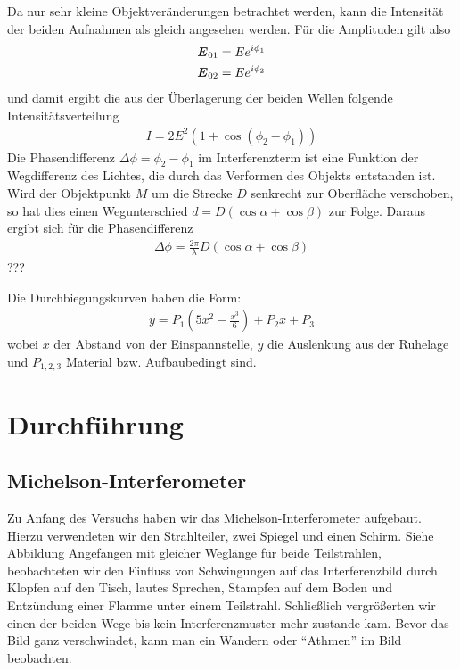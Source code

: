 \documentclass[12pt]{article}
\renewcommand*\vec[1]{{\mbox{\boldmath\ensuremath{#1}}}}
\begin{document}
Da nur sehr kleine Objektveränderungen betrachtet werden, kann die Intensität der beiden
Aufnahmen als gleich angesehen werden. Für die Amplituden gilt also
\begin{align*}
 \vec E_{01} &= E e^{i\phi_1} \\
 \vec E_{02} &= E e^{i\phi_2}
\end{align*}
und damit ergibt die aus der Überlagerung der beiden Wellen folgende Intensitätsverteilung
\begin{align}
 I = 2E^2(1+\cos{(\phi_2 - \phi_1)})
\end{align}
Die Phasendifferenz $\Delta\phi = \phi_2 - \phi_1$ im Interferenzterm ist eine Funktion der Wegdifferenz des
Lichtes, die durch das Verformen des Objekts entstanden ist. Wird der Objektpunkt $M$ um
die Strecke $D$ senkrecht zur Oberfläche verschoben, so hat dies einen Wegunterschied $d = D(\cos{\alpha} + \cos{\beta})$ zur Folge.
Daraus ergibt sich für die Phasendifferenz
\begin{align}
 \Delta\phi = \frac{2\pi}{\lambda} D(\cos{\alpha} + \cos{\beta})
\end{align}
???



Die Durchbiegungskurven haben die Form:
\begin{align}
 y = P_1 \left(5 x^2 - \frac{x^3}{6}\right) + P_2 x + P_3
\end{align}
wobei $x$ der Abstand von der Einspannstelle, $y$ die Auslenkung aus der Ruhelage und $P_{1,2,3}$ Material bzw. Aufbaubedingt sind.

\section{Durchführung}
\subsection{Michelson-Interferometer}
Zu Anfang des Versuchs haben wir das Michelson-Interferometer aufgebaut. Hierzu verwendeten wir den Strahlteiler, zwei Spiegel und einen Schirm. Siehe
Abbildung %
Angefangen mit gleicher Weglänge für beide Teilstrahlen, beobachteten wir den Einfluss von Schwingungen auf das Interferenzbild durch Klopfen auf den Tisch,
lautes Sprechen, Stampfen auf dem Boden und Entzündung einer Flamme unter einem Teilstrahl. Schließlich vergrößerten wir einen der beiden Wege bis kein 
Interferenzmuster mehr zustande kam. Bevor das Bild ganz verschwindet, kann man ein Wandern oder ``Athmen'' im Bild beobachten.
\end{document}
